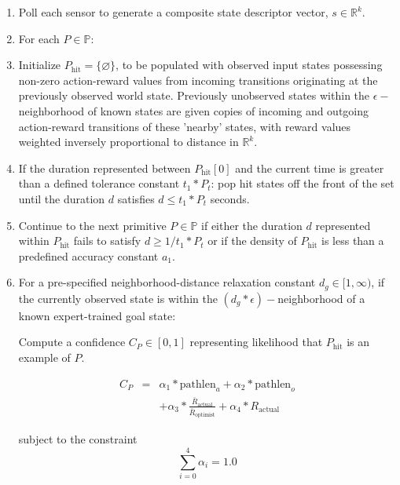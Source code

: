 \documentclass[letterpaper]{article}
\begin{document}
\begin{enumerate}
\item
Poll each sensor to generate a composite state descriptor vector, $s \in \mathbb{R}^k$.
\item
For each $P \in \mathbb{P}$:
\item
Initialize $P_{\mathrm{hit}} = \{\varnothing\}$, to be populated with observed input states possessing non-zero action-reward values from incoming transitions originating at the previously observed world state. Previously unobserved states within the $\epsilon-$neighborhood of known states are given copies of incoming and outgoing action-reward transitions of these 'nearby' states, with reward values weighted inversely proportional to distance in $\mathbb{R}^k$.
\item
If the duration represented between $P_{\mathrm{hit}}[0]$ and the current time is greater than a defined tolerance constant $t_1 * P_t$: pop hit states off the front of the set until the duration $d$ satisfies $d \leq t_1*P_t$ seconds.
\item
Continue to the next primitive $P \in \mathbb{P}$ if either the duration $d$ represented within $P_{\mathrm{hit}}$ fails to satisfy $d \geq 1/t_1 * P_t$ or if the density of $P_{\mathrm{hit}}$ is less than a predefined accuracy constant $a_1$.
\item
For a pre-specified neighborhood-distance relaxation constant $d_g \in [1,\infty)$, if the currently observed state is within the $(d_g * \epsilon)-$neighborhood of a known expert-trained goal state:

Compute a confidence $C_P \in [0,1]$ representing likelihood that $P_{\mathrm{hit}}$ is an example of $P$.


$$ \begin{array} {lcl} C_P & = & \alpha_1*\mathrm{pathlen}_{a} + \alpha_2*\mathrm{pathlen}_{o} \\ 
&  & + \alpha_3* \frac{\bar{R}_{\mathrm{actual}}}{\bar{R}_{\mathrm{optimist}}} + \alpha_4*R_{\mathrm{actual}} \end{array} $$

subject to the constraint
$$\sum_{i=0}^{4}\alpha_i = 1.0 $$


\end{enumerate}
\end{document}
